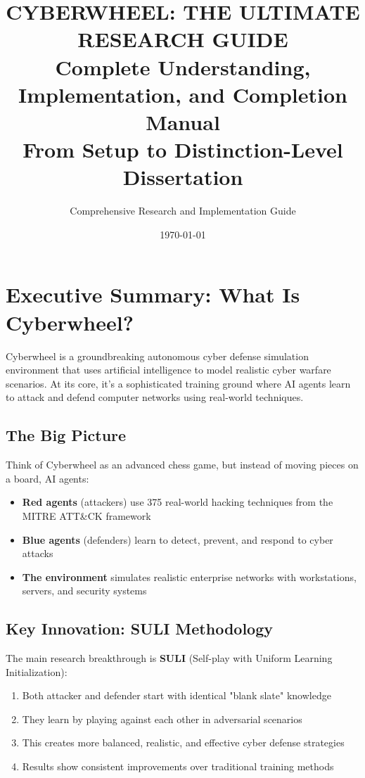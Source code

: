 \documentclass[12pt,a4paper]{article}
\title{\textbf{CYBERWHEEL: THE ULTIMATE RESEARCH GUIDE}\\
\Large Complete Understanding, Implementation, and Completion Manual\\
\large From Setup to Distinction-Level Dissertation}
\author{Comprehensive Research and Implementation Guide}
\date{\today}
\begin{document}
\maketitle
\newpage

\tableofcontents
\newpage

\section{Executive Summary: What Is Cyberwheel?}

Cyberwheel is a groundbreaking autonomous cyber defense simulation environment that uses artificial intelligence to model realistic cyber warfare scenarios. At its core, it's a sophisticated training ground where AI agents learn to attack and defend computer networks using real-world techniques.

\subsection{The Big Picture}
Think of Cyberwheel as an advanced chess game, but instead of moving pieces on a board, AI agents:
\begin{itemize}
    \item \textbf{Red agents} (attackers) use 375 real-world hacking techniques from the MITRE ATT\&CK framework
    \item \textbf{Blue agents} (defenders) learn to detect, prevent, and respond to cyber attacks
    \item \textbf{The environment} simulates realistic enterprise networks with workstations, servers, and security systems
\end{itemize}

\subsection{Key Innovation: SULI Methodology}
The main research breakthrough is \textbf{SULI} (Self-play with Uniform Learning Initialization):
\begin{enumerate}
    \item Both attacker and defender start with identical "blank slate" knowledge
    \item They learn by playing against each other in adversarial scenarios
    \item This creates more balanced, realistic, and effective cyber defense strategies
    \item Results show consistent improvements over traditional training methods
\end{enumerate}
\end{document}
